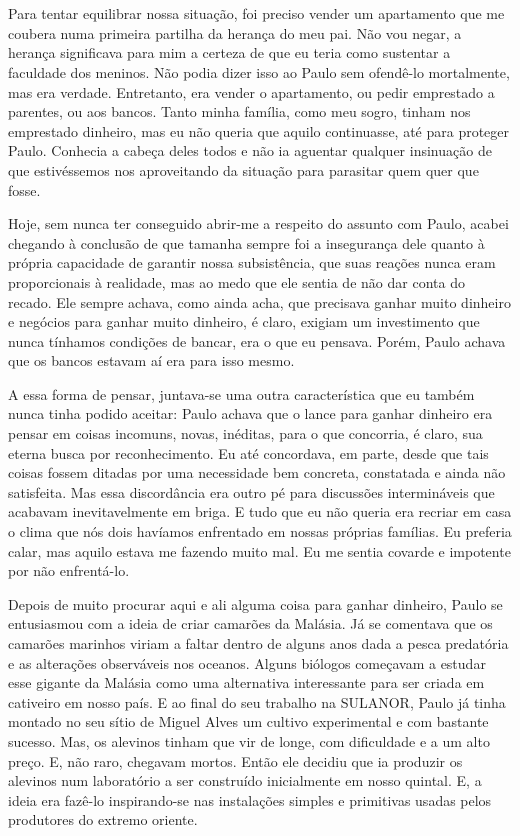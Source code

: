 \chapter{}

Para tentar equilibrar nossa situação, foi preciso vender um apartamento que me coubera numa primeira partilha da herança do meu pai.
Não vou negar, a herança significava para mim a certeza de que eu teria como sustentar a faculdade dos meninos.
Não podia dizer isso ao Paulo sem ofendê-lo mortalmente, mas era verdade.
Entretanto, era vender o apartamento, ou pedir emprestado a parentes, ou aos bancos.
Tanto minha família, como meu sogro, tinham nos emprestado dinheiro, mas eu não queria que aquilo continuasse, até para proteger Paulo.
Conhecia a cabeça deles todos e não ia aguentar qualquer insinuação de que estivéssemos nos aproveitando da situação para parasitar quem quer que fosse.

Hoje, sem nunca ter conseguido abrir-me a respeito do assunto com Paulo, acabei chegando à conclusão de que tamanha sempre foi a insegurança dele quanto à própria capacidade de garantir nossa subsistência, que suas reações nunca eram proporcionais à realidade, mas ao medo que ele sentia de não dar conta do recado.
Ele sempre achava, como ainda acha, que precisava ganhar muito dinheiro e negócios para ganhar muito dinheiro, é claro, exigiam um investimento que nunca tínhamos condições de bancar, era o que eu pensava.
Porém, Paulo achava que os bancos estavam aí era para isso mesmo.

A essa forma de pensar, juntava-se uma outra característica que eu também nunca tinha podido aceitar: Paulo achava que o lance para ganhar dinheiro era pensar em coisas incomuns, novas, inéditas, para o que concorria, é claro, sua eterna busca por reconhecimento.
Eu até concordava, em parte, desde que tais coisas fossem ditadas por uma necessidade bem concreta, constatada e ainda não satisfeita.
Mas essa discordância era outro pé para discussões intermináveis que acabavam inevitavelmente em briga.
E tudo que eu não queria era recriar em casa o clima que nós dois havíamos enfrentado em nossas próprias famílias.
Eu preferia calar, mas aquilo estava me fazendo muito mal.
Eu me sentia covarde e impotente por não enfrentá-lo.

Depois de muito procurar aqui e ali alguma coisa para ganhar dinheiro, Paulo se entusiasmou com a ideia de criar camarões da Malásia.
Já se comentava que os camarões marinhos viriam a faltar dentro de alguns anos dada a pesca predatória e as alterações observáveis nos oceanos.
Alguns biólogos começavam a estudar esse gigante da Malásia como uma alternativa interessante para ser criada em cativeiro em nosso país.
E ao final do seu trabalho na SULANOR, Paulo já tinha montado no seu sítio de Miguel Alves um cultivo experimental e com bastante sucesso.
Mas, os alevinos tinham que vir de longe, com dificuldade e a um alto preço.
E, não raro, chegavam mortos.
Então ele decidiu que ia produzir os alevinos num laboratório a ser construído inicialmente em nosso quintal.
E, a ideia era fazê-lo inspirando-se nas instalações simples e primitivas usadas pelos produtores do extremo oriente.


